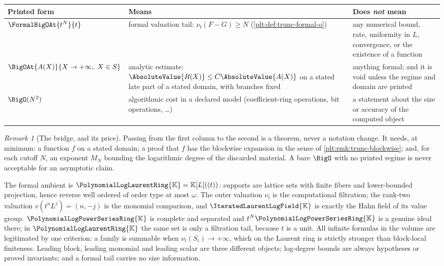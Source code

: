 \documentclass[11pt,oneside]{article}
\theoremstyle{plain}
\theoremstyle{definition}
\theoremstyle{remark}
\newtheorem{remark}[theorem]{Remark}
\newcommand{\K}{\mathbb{K}}
\newcommand{\PLpow}{\PolynomialLogPowerSeriesRing{\K}}   %
\newcommand{\PLlau}{\PolynomialLogLaurentRing{\K}}       %
\newcommand{\PLit}{\IteratedLaurentLogField{\K}}         %
\newcommand{\ordt}{\nu_{t}}                              %
\begin{document}
\begin{center}
\begin{tabular}{@{}lp{}p{}@{}}
\hline
Printed form & Means & Does \emph{not} mean \\
\hline
\(\FormalBigOAt{t^N}{t}\)
 & formal valuation tail: \(\ordt(F-G)\ge N\)
   (\cref{plt:def:trunc-formal-o})
 & any numerical bound, rate, uniformity in \(L\), convergence, or the
   existence of a function \\
\(\BigOAt{A(X)}{X\to+\infty,\ X\in S}\)
 & analytic estimate: \(\AbsoluteValue{R(X)}\le C\AbsoluteValue{A(X)}\) on a
   stated late part of a stated domain, with branches fixed
 & anything formal; and it is void unless the regime and domain are printed \\
\(\BigO(N^2)\)
 & algorithmic cost in a declared model (coefficient-ring operations, bit
   operations, \dots)
 & a statement about the size or accuracy of the computed object \\
\hline
\end{tabular}
\end{center}

\begin{remark}[The bridge, and its price]
\label{plt:rmk:trunc-bridge}
Passing from the first column to the second is a theorem, never a notation
change.  It needs, at minimum: a function \(f\) on a stated domain; a proof
that \(f\) has the blockwise expansion in the sense of
\cref{plt:rmk:trunc-blockwise}; and, for each cutoff \(N\), an exponent
\(M_N\) bounding the logarithmic degree of the discarded material.  A bare
\(\BigO\) with no printed regime is never acceptable for an asymptotic claim.
\end{remark}

\begin{summarybox}
The formal ambient is \(\PLlau=\K[L]((t))\): supports are lattice sets with
finite fibers and lower-bounded projection, hence reverse well ordered of
order type at most \(\omega\).  The outer valuation \(\ordt\) is the
computational filtration; the rank-two valuation
\(v(t^nL^j)=(n,-j)\) is the monomial comparison, and \(\PLit\) is exactly the
Hahn field of its value group.  \(\PLpow\) is complete and separated and
\(t^N\PLpow\) is a genuine ideal there; in \(\PLlau\) the same set is only a
filtration tail, because \(t\) is a unit.  All infinite formulas in the
volume are legitimated by one criterion: a family is summable when
\(\ordt(S_i)\to+\infty\), which on the Laurent ring is strictly stronger than
block-local finiteness.  Leading block, leading monomial and leading scalar
are three different objects; log-degree bounds are always hypotheses or proved
invariants; and a formal tail carries no size information.
\end{summarybox}
\end{document}
